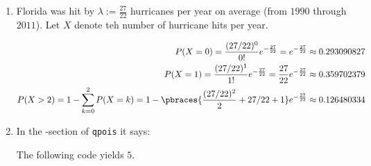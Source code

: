 \begin{solution}

\phantom{}

\begin{enumerate}[label = (\alph*)]

    \item Florida was hit by $\lambda := \frac{27}{22}$ hurricanes per year on average (from $1990$ through $2011$).
    Let $X$ denote teh number of hurricane hits per year.

    \begin{align}
        P(X = 0)
        =
        \frac{(27 / 22)^0}{0!} e^{-\frac{27}{22}}
        =
        e^{-\frac{27}{22}}
        \approx
        0.293090827 \\
        P(X = 1)
        =
        \frac{(27 / 22)^1}{1!} e^{-\frac{27}{22}}
        =
        \frac{27}{22} e^{-\frac{27}{22}}
        \approx
        0.359702379 \\
        P(X > 2)
        =
        1 - \sum_{k=0}^2 P(X = k)
        =
        1 - \pbraces
        {
            \frac{(27 / 22)^2}{2} + 27 / 22 + 1
        }
        e^{-\frac{27}{22}}
        \approx
        0.126480334
    \end{align}

    \item In the -section of \texttt{qpois} it says:

    The following code yields $5$.

    \lstset{style = fundament}
    

\end{enumerate}

\end{solution}

